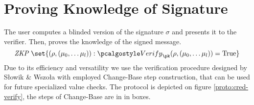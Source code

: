 
\section{Proving Knowledge of Signature}

The user computes a blinded version of the signature $\sigma$ and presents it to the verifier. Then, proves the knowledge of the signed message.
$$ \textstyle \textit{ZKP } \set{(\rho, (\mu_0, \dots \mu_l) ): \verify_\pk (\rho, (\mu_0, \dots \mu_l) ) = \text{True} }$$
Due to its efficiency and versatility we use the verification procedure designed by Słowik \& Wszoła   \cite{slowik-efficient-cl-lrsw} with employed Change-Base step construction, that can be used for future specialized value checks. The protocol is depicted on figure \ref{proto:cred-verify}, the steps of Change-Base are in in boxes.

